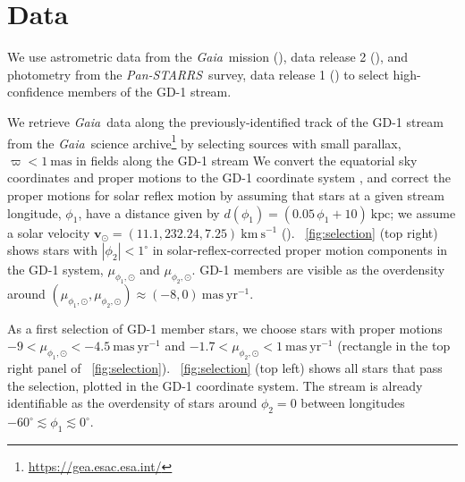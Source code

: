\documentclass[modern]{aastex62}
\newcommand{\gaia}{\textsl{Gaia}}
\newcommand{\pans}{\textsl{Pan-STARRS}}
\newcommand{\kms}{\ensuremath{\textrm{km}~\textrm{s}^{-1}}}
\newcommand{\bs}[1]{\boldsymbol{#1}}
\newcommand{\masyr}{\ensuremath{\textrm{mas}~\textrm{yr}^{-1}}}
\begin{document}
\section{Data}
\label{sec:data}

We use astrometric data from the \gaia\ mission (\citealt{Prusti:2016}), data
release 2 (\citealt{Gaia-Collaboration:2018, Lindegren:2018}), and photometry
from the \pans\ survey, data release 1 (\citealt{Chambers:2016}) to select
high-confidence members of the GD-1 stream.

We retrieve \gaia\ data along the previously-identified track of the GD-1 stream
from the \gaia\ science archive\footnote{\url{https://gea.esac.esa.int/}} by
selecting sources with small parallax, $\varpi < 1~\textrm{mas}$ in fields along the GD-1 stream
We convert the equatorial sky coordinates and proper motions %
to the GD-1 coordinate system \citep[$\phi_1, \phi_2$,][]{Koposov:2010}, and correct the proper motions for solar reflex
motion by assuming that stars at a given stream longitude, $\phi_1$, have a
distance given by $d(\phi_1) = (0.05 \, \phi_1 + 10)~\textrm{kpc}$;
we assume a solar velocity $\bs{v}_\odot = (11.1, 232.24, 7.25)~\kms$
(\citealt{Schonrich:2010, Bovy:2015}).
\figurename~\ref{fig:selection} (top right) shows stars with $|\phi_2| <
1^\circ$ in solar-reflex-corrected proper motion components in the GD-1 system,
$\mu_{\phi_1, \odot}$ and $\mu_{\phi_2, \odot}$.
GD-1 members are visible as the overdensity around $(\mu_{\phi_1, \odot},
\mu_{\phi_2, \odot}) \approx (-8, 0)~\masyr$.

As a first selection of GD-1 member stars, we choose stars with proper motions
$-9 < \mu_{\phi_1, \odot} < -4.5~\masyr$ and $-1.7 < \mu_{\phi_2, \odot} <
1~\masyr$ (rectangle in the top right panel of
\figurename~\ref{fig:selection}).
\figurename~\ref{fig:selection} (top left) shows all stars that pass the
selection, plotted in the GD-1 coordinate system.
The stream is already identifiable as the overdensity of stars around $\phi_2 =
0$ between longitudes $-60^\circ \lesssim \phi_1 \lesssim 0^\circ$.
\end{document}
